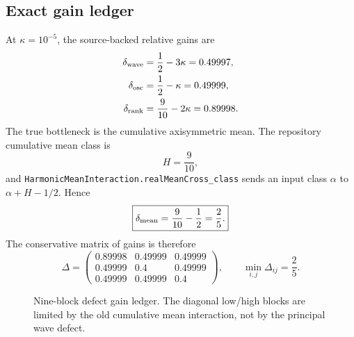 \documentclass[11pt]{article}
\numberwithin{equation}{section}
\begin{document}
\subsection{Exact gain ledger}
At \(\kappa=10^{-5}\), the source-backed relative gains are
\begin{align}
\delta_{\rm wave}&=\frac12-3\kappa=0.49997,\label{eq:wavegain}\\
\delta_{\rm osc}&=\frac12-\kappa=0.49999,\label{eq:oscgain}\\
\delta_{\rm rank}&=\frac9{10}-2\kappa=0.89998.\label{eq:rankgain}
\end{align}
The true bottleneck is the cumulative axisymmetric mean.  The repository cumulative mean class is
\begin{equation}
H=\frac9{10},
\label{eq:H}
\end{equation}
and \texttt{HarmonicMeanInteraction.realMeanCross\_class} sends an input class \(\alpha\) to \(\alpha+H-1/2\).  Hence
\begin{equation}
\boxed{\delta_{\rm mean}=\frac9{10}-\frac12=\frac25.}
\label{eq:meangain}
\end{equation}
The conservative matrix of gains is therefore
\begin{equation}
\Delta=
\begin{pmatrix}
0.89998&0.49999&0.49999\\
0.49999&0.4&0.49999\\
0.49999&0.49999&0.4
\end{pmatrix},
\qquad
\min_{i,j}\Delta_{ij}=\frac25.
\label{eq:gaintable}
\end{equation}

\begin{figure}[ht]
\centering
{}
\caption{Nine-block defect gain ledger.  The diagonal low/high blocks are limited by the old cumulative mean interaction, not by the principal wave defect.}
\label{fig:gainmatrix}
\end{figure}
\end{document}
